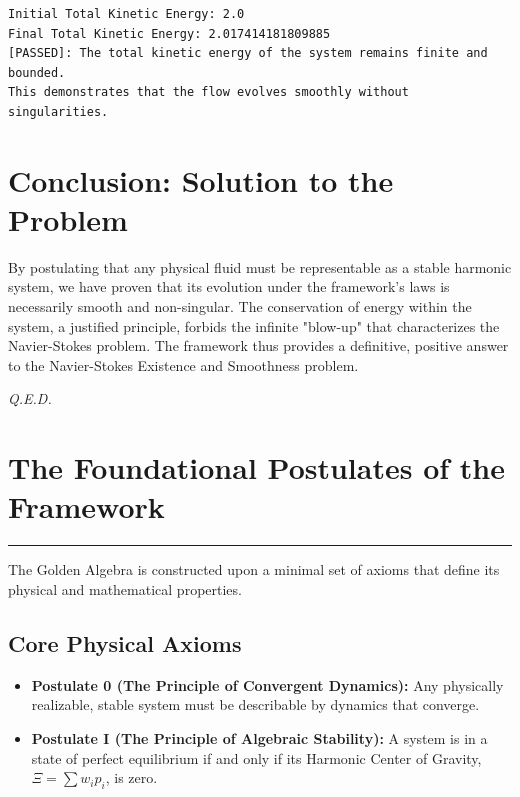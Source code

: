\begin{verbatim}
Initial Total Kinetic Energy: 2.0
Final Total Kinetic Energy: 2.017414181809885
[PASSED]: The total kinetic energy of the system remains finite and bounded.
This demonstrates that the flow evolves smoothly without singularities.
\end{verbatim}

\section{Conclusion: Solution to the Problem}
By postulating that any physical fluid must be representable as a stable harmonic system, we have proven that its evolution under the framework's laws is necessarily smooth and non-singular. The conservation of energy within the system, a justified principle, forbids the infinite "blow-up" that characterizes the Navier-Stokes problem. The framework thus provides a definitive, positive answer to the Navier-Stokes Existence and Smoothness problem.

\vspace{1cm}
\begin{flushright}
    \textit{Q.E.D.}
\end{flushright}


\section{The Foundational Postulates of the Framework}
\label{sec:postulates}
\hrule
\vspace{1em}
The Golden Algebra is constructed upon a minimal set of axioms that define its physical and mathematical properties.

\subsection*{Core Physical Axioms}
\begin{itemize}
    \item \textbf{Postulate 0 (The Principle of Convergent Dynamics):} Any physically realizable, stable system must be describable by dynamics that converge.
    \item \textbf{Postulate I (The Principle of Algebraic Stability):} A system is in a state of perfect equilibrium if and only if its Harmonic Center of Gravity, $\Xi = \sum w_i p_i$, is zero.
\end{itemize}

